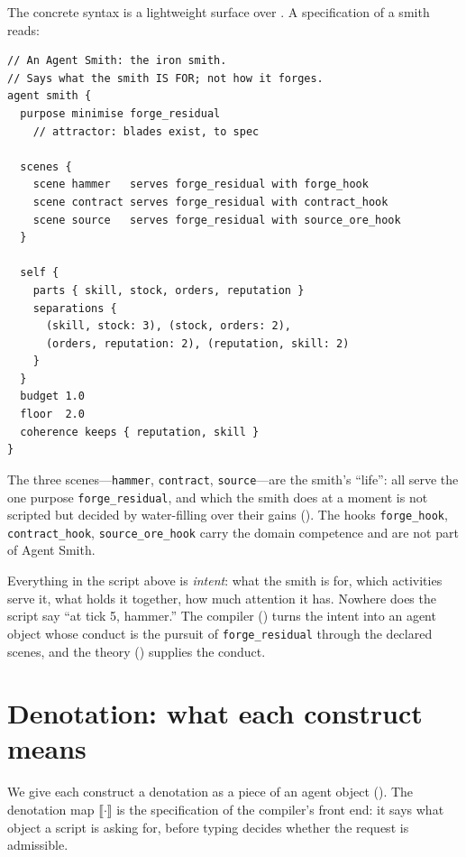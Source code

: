 \documentclass[11pt,twocolumn,a4paper]{article}
\begin{document}
The concrete syntax is a lightweight surface over . A
specification of a smith reads:

\begin{lstlisting}
// An Agent Smith: the iron smith.
// Says what the smith IS FOR; not how it forges.
agent smith {
  purpose minimise forge_residual
    // attractor: blades exist, to spec

  scenes {
    scene hammer   serves forge_residual with forge_hook
    scene contract serves forge_residual with contract_hook
    scene source   serves forge_residual with source_ore_hook
  }

  self {
    parts { skill, stock, orders, reputation }
    separations {
      (skill, stock: 3), (stock, orders: 2),
      (orders, reputation: 2), (reputation, skill: 2)
    }
  }
  budget 1.0
  floor  2.0
  coherence keeps { reputation, skill }
}
\end{lstlisting}

\noindent The three scenes---\texttt{hammer}, \texttt{contract},
\texttt{source}---are the smith's ``life'': all serve the one purpose
\texttt{forge\_residual}, and which the smith does at a moment is not scripted
but decided by water-filling over their gains (). The hooks
\texttt{forge\_hook}, \texttt{contract\_hook}, \texttt{source\_ore\_hook}
carry the domain competence and are not part of Agent Smith.

\begin{remark}
\label{rem:intent}
Everything in the script above is \emph{intent}: what the smith is for, which
activities serve it, what holds it together, how much attention it has.
Nowhere does the script say ``at tick 5, hammer.'' The compiler
() turns the intent into an agent object whose conduct is
the pursuit of \texttt{forge\_residual} through the declared scenes, and the
theory () supplies the conduct.
\end{remark}

\section{Denotation: what each construct means}
\label{sec:denotation}

We give each construct a denotation as a piece of an agent object
(). The denotation map $\llbracket\cdot\rrbracket$ is
the specification of the compiler's front end: it says what object a script is
asking for, before typing decides whether the request is admissible.
\end{document}
